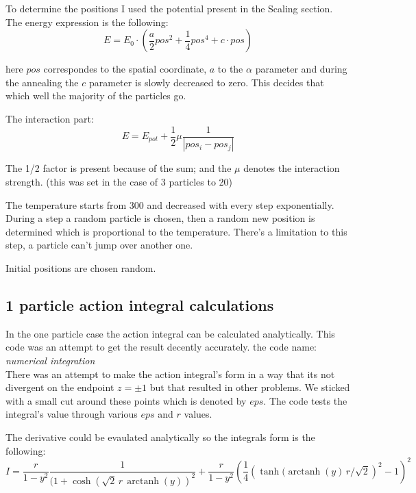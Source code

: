 \documentclass[12pt,a4paper]{article}
\DeclareMathOperator\arctanh{arctanh}
\numberwithin{equation}{section}
\begin{document}
To determine the positions I used the potential present in the Scaling section. The energy expression is the following:
\begin{equation}
E = E_0 \cdot \left( \frac{a}{2} pos^2 + \frac{1}{4} pos^4  + c \cdot pos \right)
\end{equation}

here $pos$ correspondes to the spatial coordinate, $a$ to the $\alpha$ parameter and during the annealing the $c$ parameter is slowly decreased to zero. This decides that which well the majority of the particles go.

The interaction part:
\begin{equation}
E = E_{pot} + \frac{1}{2} \mu \frac{1}{\left| pos_i - pos_j  \right|}
\end{equation}

The 1/2 factor is present because of the sum; and the $\mu$ denotes the interaction strength. (this was set in the case of 3 particles to 20)

The temperature starts from 300 and decreased with every step exponentially. During a step a random particle is chosen, then a random new position is determined which is proportional to the temperature. There's a limitation to this step, a particle can't jump over another one.

Initial positions are chosen random.

\subsection{1 particle action integral calculations}
In the one particle case the action integral can be calculated analytically. This code was an attempt to get the result decently accurately.
the code name: \textit{numerical integration }\\

There was an attempt to make the action integral's form in a way that its not divergent on the endpoint $z=\pm 1$ but that resulted in other problems. We sticked with a small cut around these points which is denoted by $eps$. The code tests the integral's value through various $eps$ and $r$ values.

The derivative could be evaulated analytically so the integrals form is the following:
\begin{equation}
I = \frac{r}{1-y^2} \frac{1}{(1 + \cosh(\sqrt{2}\,r\,{\arctanh}(y))^2} + \frac{r}{1-y^2}\left(  \frac{1}{4} \left(  \tanh(\arctanh(y) \, r/ \sqrt{2} \right)^2 -1 \right)^2
\end{equation}
\end{document}
